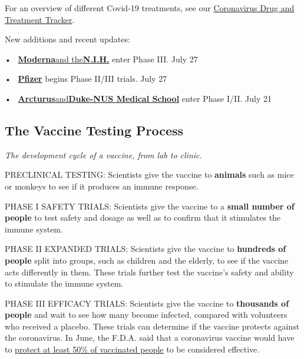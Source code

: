 For an overview of different Covid-19 treatments, see our
\href{https://www.nytimes.com/interactive/2020/science/coronavirus-drugs-treatments.html}{Coronavirus
Drug and Treatment Tracker}.

New additions and recent updates:

•~
\textbf{\protect\hyperlink{moderna}{Moderna}}\protect\hyperlink{moderna}{and
the}\textbf{\protect\hyperlink{moderna}{N.I.H.}} enter Phase III. July
27

•~ \textbf{\protect\hyperlink{biontech}{Pfizer}} begins Phase II/III
trials. July 27

•~
\textbf{\protect\hyperlink{arcturus}{Arcturus}}\protect\hyperlink{arcturus}{and}\textbf{\protect\hyperlink{arcturus}{Duke-NUS
Medical School}} enter Phase I/II. July 21

\hypertarget{the-vaccine-testing-process}{%
\subsection{\texorpdfstring{\textbf{The Vaccine Testing
Process}}{The Vaccine Testing Process}}\label{the-vaccine-testing-process}}

\emph{The development cycle of a vaccine, from lab to clinic.}

PRECLINICAL TESTING: Scientists give the vaccine to \textbf{animals}
such as mice or monkeys to see if it produces an immune response.

PHASE I SAFETY TRIALS: Scientists give the vaccine to a \textbf{small
number of people} to test safety and dosage as well as to confirm that
it stimulates the immune system.

PHASE II EXPANDED TRIALS: Scientists give the vaccine to
\textbf{hundreds of people} split into groups, such as children and the
elderly, to see if the vaccine acts differently in them. These trials
further test the vaccine's safety and ability to stimulate the immune
system.

PHASE III EFFICACY TRIALS: Scientists give the vaccine to
\textbf{thousands of people} and wait to see how many become infected,
compared with volunteers who received a placebo. These trials can
determine if the vaccine protects against the coronavirus. In June, the
F.D.A. said that a coronavirus vaccine would have to
\href{https://www.fda.gov/news-events/press-announcements/coronavirus-covid-19-update-fda-takes-action-help-facilitate-timely-development-safe-effective-covid}{protect
at least 50\% of vaccinated people} to be considered effective.

